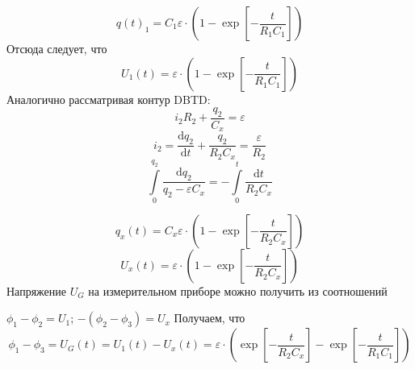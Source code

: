 \documentclass[a4paper,12pt]{extarticle}
\begin{document}
\begin{equation}
	q(t)_1 = C_1 \varepsilon \cdot 
	\left( 
		1-
		\exp\left[		
			-\frac{t}{R_1 C_1}
		\right]
	\right)
\end{equation}
Отсюда следует, что
\begin{equation}
	U_1(t) = \varepsilon \cdot 
	\left( 
		1-
		\exp\left[		
			-\frac{t}{R_1 C_1}
		\right]
	\right)
\end{equation}
Аналогично рассматривая контур DBTD:
\begin{equation}
i_2 R_2 + \frac{q_2}{C_x}=\varepsilon
\end{equation}
\begin{equation}
i_2=\frac{\mathrm{d}q_2 }{\mathrm{d} t} + \frac{q_2}{R_2 C_x}=\frac{\varepsilon}{R_2}
\end{equation}
\begin{equation}
 \int \limits^{q_2}_0 \frac{\mathrm{d} q_2}{q_2-\varepsilon C_x}=-\int \limits^t_0 \frac{\mathrm{d} t}{R_2 C_x}
\end{equation}

\begin{equation}
q_x(t) = C_x \varepsilon \cdot 
\left( 
	1-
	\exp\left[		
		-\frac{t}{R_2 C_x}
	\right]
\right)
\end{equation}
\begin{equation}
U_x(t) =  \varepsilon \cdot 
\left( 
	1- 
	\exp\left[
	{-\frac{t}{R_2 C_x}}
	\right]
\right)
\end{equation}
Напряжение $U_G$ на измерительном приборе можно получить из соотношений

$\phi_1-\phi_2=U_1$; $-(\phi_2-\phi_3)=U_x$
Получаем, что
\begin{equation}
 \phi_1-\phi_3 =U_G(t)=U_1(t)-U_x(t)= \varepsilon \cdot 
	\left( 
		\exp\left[		
			-\frac{t}{R_2 C_x}
		\right]
		-
		\exp\left[		
			-\frac{t}{R_1 C_1}
		\right]
 	\right)
\end{equation}
\end{document}
